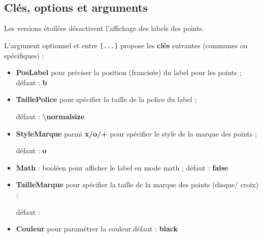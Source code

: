 \documentclass[french,a4paper,11pt]{article}
\newcommand\Cle[1]{{\bfseries\sffamily\textlangle #1\textrangle}}
\begin{document}
\hfill
{}
\hfill~

\begin{DemoCode}
\end{DemoCode}

\hfill
{}
\hfill~

\subsection{Clés, options et arguments}

\begin{tipblock}
Les versions étoilées désactivent l'affichage des labels des points.

\smallskip

L'argument optionnel et entre \texttt{[...]} propose les \Cle{clés} suivantes (communes ou spécifiques) :

\begin{itemize}
	\item \Cle{PosLabel} pour préciser la position (francisée) du label pour les points ; \hfill{}défaut : \Cle{b}
	\item \Cle{TaillePolice} pour spécifier la taille de la police du label ;
	
	\hfill{}défaut : \Cle{\textbackslash normalsize}
	\item \Cle{StyleMarque} parmi \Cle{x/o/+} pour spécifier le style de la marque des points ;
	
	\hfill{}défaut : \Cle{o}
	\item \Cle{Math} : booléen pour afficher le label en mode math ; \hfill{}défaut : \Cle{false}
	\item \Cle{TailleMarque} pour spécifier la taille de la marque des points (disque/ croix) ;
	
	\hfill{}défaut : \Cle{2pt}
	\item \Cle{Couleur} pour paramétrer la couleur.\hfill{}défaut : \Cle{black}
\end{itemize}
\vspace*{-\baselineskip}\leavevmode
\end{tipblock}
\end{document}
